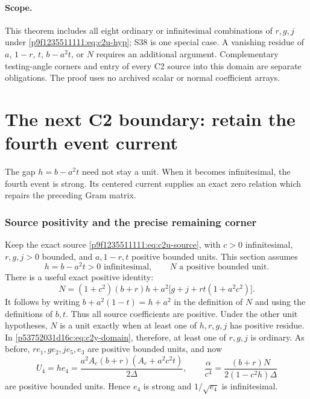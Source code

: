 \paragraph{Scope.}
This theorem includes all eight ordinary or infinitesimal combinations
of $r,g,j$ under \eqref{p9f1235511111:eq:c2u-hyp}; S38 is one special case.
A vanishing residue of $a$, $1-r$, $t$, $b-a^2t$, or $N$ requires
an additional argument.  Complementary testing-angle corners and
entry of every C2 source into this domain are separate obligations.
The proof uses no archived scalar or normal coefficient arrays.


\section{\texorpdfstring{The next C2 boundary: retain the fourth event current}{The next C2 boundary: retain the fourth event current}}
\label{component:p53752031d16c}

\label{p53752031d16c:sec:c2-y-current}

The gap $h=b-a^2t$ need not stay a unit.  When it becomes
infinitesimal, the fourth event is strong.  Its centered current supplies
an exact zero relation which repairs the preceding Gram matrix.

\subsubsection*{Source positivity and the precise remaining corner}
Keep the exact source \eqref{p9f1235511111:eq:c2u-source}, with $c>0$ infinitesimal,
$r,g,j>0$ bounded, and $a,1-r,t$ positive bounded units.  This section
assumes
\begin{equation}
h=b-a^2t>0\text{ infinitesimal},\qquad N\text{ a positive bounded unit}.
\label{p53752031d16c:eq:c2y-domain}
\end{equation}
There is a useful exact positive identity:
\begin{equation}
N=(1+c^2)(b+r)h+a^2\bigl[g+j+rt(1+a^2c^2)\bigr].
\label{p53752031d16c:eq:c2y-N-positive}
\end{equation}
It follows by writing $b+a^2(1-t)=h+a^2$ in the definition of $N$
and using the definitions of $b,t$.  Thus all source coefficients are
positive.  Under the other unit hypotheses, $N$ is a unit exactly when
at least one of $h,r,g,j$ has positive residue.  In
\eqref{p53752031d16c:eq:c2y-domain}, therefore, at least one of $r,g,j$ is ordinary.
As before, $re_1,ge_2,je_5,e_3$ are positive bounded units, and now
\begin{equation}
U_4=he_4=\frac{a^2A_c(b+r)(A_c+a^2c^2t)}{2\Delta},\qquad
\frac{\alpha}{c^4}=\frac{(b+r)N}{2(1-c^2h)\Delta}
\label{p53752031d16c:eq:c2y-units}
\end{equation}
are positive bounded units.  Hence $e_4$ is strong and
$1/\sqrt{e_4}$ is infinitesimal.

